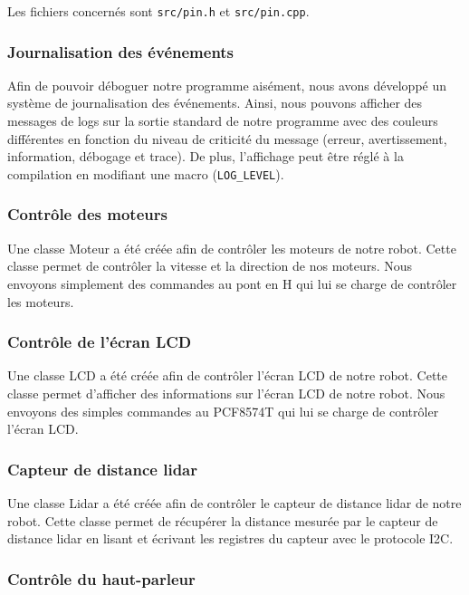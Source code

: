 Les fichiers concernés sont \texttt{src/pin.h} et \texttt{src/pin.cpp}.

\subsubsection{Journalisation des événements}

Afin de pouvoir déboguer notre programme aisément, nous avons développé un système de journalisation des événements.
Ainsi, nous pouvons afficher des messages de logs sur la sortie standard de notre programme avec des couleurs différentes en fonction du niveau de criticité du message (erreur, avertissement, information, débogage et trace).
De plus, l'affichage peut être réglé à la compilation en modifiant une macro (\texttt{LOG\_LEVEL}).

\subsubsection{Contrôle des moteurs}

Une classe Moteur a été créée afin de contrôler les moteurs de notre robot. Cette classe permet de contrôler la vitesse et la direction de nos moteurs.
Nous envoyons simplement des commandes au pont en H qui lui se charge de contrôler les moteurs.

\subsubsection*{Contrôle de l'écran LCD}
Une classe LCD a été créée afin de contrôler l'écran LCD de notre robot. Cette classe permet d'afficher des informations sur l'écran LCD de notre robot.
Nous envoyons des simples commandes au PCF8574T qui lui se charge de contrôler l'écran LCD.

\subsubsection*{Capteur de distance lidar}

Une classe Lidar a été créée afin de contrôler le capteur de distance lidar de notre robot.
Cette classe permet de récupérer la distance mesurée par le capteur de distance lidar en lisant et écrivant les registres du capteur avec le protocole I2C.

\subsubsection*{Contrôle du haut-parleur}

